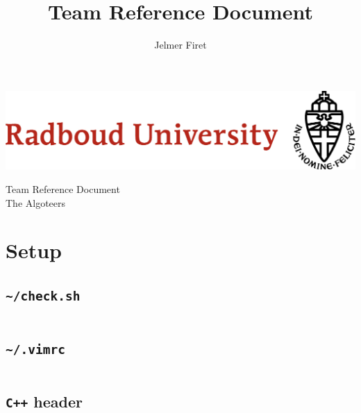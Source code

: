 \documentclass[11pt, a4paper]{amsart}
\title{Team Reference Document}
\author{Jelmer Firet}
\begin{document}
	\begin{center}
		\begin{minipage}[c]{0.45\textwidth}
			\includegraphics[width=\textwidth]{resouce/radboud_logo_full.jpg}
		\end{minipage}\;
		\begin{minipage}[c]{0.35\textwidth}
			\LARGE Team Reference Document\\
			\Large The Algoteers
		\end{minipage}
	\end{center}
	\begin{multicols}{2}
		\tableofcontents
		\columnbreak
		\vfill\null
	\end{multicols}
	\vfill\null
	\newpage
	\setcounter{page}{2}
	\section{Setup} %
	\begin{multicols}{2}
		\subsection{\texttt{\textasciitilde/check.sh}}
		\inputminted[lastline=8]{sh}{.code/setup/check.sh}
		\subsection{\texttt{\textasciitilde/.vimrc}}
		\inputminted[lastline=9]{sh}{.code/setup/vimrc.sh}
		\columnbreak
		\subsection{\texttt{C++} header}
		\inputminted[lastline=17]{cpp}{.code/setup/header.cpp}
	\end{multicols}
\end{document}
